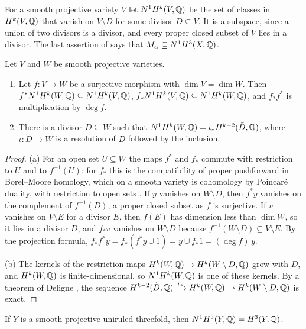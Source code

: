 For a smooth projective variety $V$ let $N^{1}H^{k}(V,\mathbb{Q})$ be the set of
classes in $H^{k}(V,\mathbb{Q})$ that vanish on $V\setminus D$ for some divisor
$D\subseteq V$. It is a subspace, since a union of two divisors is a
divisor, and every proper closed subset of $V$ lies in a divisor. The last
assertion of  says that $M_{\alpha}\subseteq N^{1}H^{3}
(X,\mathbb{Q})$.

\begin{lemma}\label{lem:N1}
Let $V$ and $W$ be smooth projective varieties.
\begin{enumerate}[label=\textup{(\alph*)}]
\item Let $f\colon V\to W$ be a surjective morphism with $\dim V=\dim W$.
Then $f^{*}N^{1}H^{k}(W,\mathbb{Q})\subseteq N^{1}H^{k}(V,\mathbb{Q})$,
$f_{*}N^{1}H^{k}(V,\mathbb{Q})\subseteq N^{1}H^{k}(W,\mathbb{Q})$, and $f_{*}f^{*}$ is
multiplication by $\deg f$.
\item There is a divisor $D\subseteq W$ such that $N^{1}H^{k}(W,\mathbb{Q})=
\iota_{*}H^{k-2}(\tilde D,\mathbb{Q})$, where $\iota\colon\tilde D\to W$ is a
resolution of $D$ followed by the inclusion.
\end{enumerate}
\end{lemma}

\begin{proof}
(a) For an open set $U\subseteq W$ the maps $f^{*}$ and $f_{*}$ commute with
restriction to $U$ and to $f^{-1}(U)$; for $f_{*}$ this is the compatibility
of proper pushforward in Borel--Moore homology, which on a smooth variety is
cohomology by Poincar\'e duality, with restriction to open sets
\cite[\S19.1]{Ful98}. If $y$ vanishes on $W\setminus D$, then $f^{*}y$
vanishes on the complement of $f^{-1}(D)$, a proper closed subset as $f$ is
surjective. If $v$ vanishes on $V\setminus E$ for a divisor $E$, then $f(E)$
has dimension less than $\dim W$, so it lies in a divisor $D$, and $f_{*}v$
vanishes on $W\setminus D$ because $f^{-1}(W\setminus D)\subseteq V\setminus
E$. By the projection formula, $f_{*}f^{*}y=f_{*}(f^{*}y\cup1)=y\cup
f_{*}1=(\deg f)\,y$.

(b) The kernels of the restriction maps $H^{k}(W,\mathbb{Q})\to H^{k}(W\setminus
D,\mathbb{Q})$ grow with $D$, and $H^{k}(W,\mathbb{Q})$ is finite-dimensional, so
$N^{1}H^{k}(W,\mathbb{Q})$ is one of these kernels. By a theorem of Deligne
\cite[Corollaire~8.2.8]{Del74}, the sequence $H^{k-2}(\tilde D,\mathbb{Q})
\xrightarrow{\iota_{*}}H^{k}(W,\mathbb{Q})\to H^{k}(W\setminus D,\mathbb{Q})$ is exact.
\end{proof}

\begin{lemma}\label{lem:uniruledN1}
If $Y$ is a smooth projective uniruled threefold, then $N^{1}H^{3}(Y,\mathbb{Q})=
H^{3}(Y,\mathbb{Q})$.
\end{lemma}

